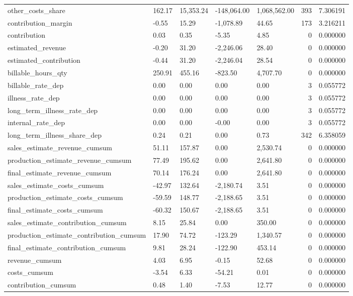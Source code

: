 \begin{longtable}{lllllrr}
other_costs_share & 162.17 & 15,353.24 & -148,064.00 & 1,068,562.00 & 393 & 7.306191 \\
contribution_margin & -0.55 & 15.29 & -1,078.89 & 44.65 & 173 & 3.216211 \\
contribution & 0.03 & 0.35 & -5.35 & 4.85 & 0 & 0.000000 \\
estimated_revenue & -0.20 & 31.20 & -2,246.06 & 28.40 & 0 & 0.000000 \\
estimated_contribution & -0.44 & 31.20 & -2,246.04 & 28.54 & 0 & 0.000000 \\
billable_hours_qty & 250.91 & 455.16 & -823.50 & 4,707.70 & 0 & 0.000000 \\
billable_rate_dep & 0.00 & 0.00 & 0.00 & 0.00 & 3 & 0.055772 \\
illness_rate_dep & 0.00 & 0.00 & 0.00 & 0.00 & 3 & 0.055772 \\
long_term_illness_rate_dep & 0.00 & 0.00 & 0.00 & 0.00 & 3 & 0.055772 \\
internal_rate_dep & 0.00 & 0.00 & -0.00 & 0.00 & 3 & 0.055772 \\
long_term_illness_share_dep & 0.24 & 0.21 & 0.00 & 0.73 & 342 & 6.358059 \\
sales_estimate_revenue_cumsum & 51.11 & 157.87 & 0.00 & 2,530.74 & 0 & 0.000000 \\
production_estimate_revenue_cumsum & 77.49 & 195.62 & 0.00 & 2,641.80 & 0 & 0.000000 \\
final_estimate_revenue_cumsum & 70.14 & 176.24 & 0.00 & 2,641.80 & 0 & 0.000000 \\
sales_estimate_costs_cumsum & -42.97 & 132.64 & -2,180.74 & 3.51 & 0 & 0.000000 \\
production_estimate_costs_cumsum & -59.59 & 148.77 & -2,188.65 & 3.51 & 0 & 0.000000 \\
final_estimate_costs_cumsum & -60.32 & 150.67 & -2,188.65 & 3.51 & 0 & 0.000000 \\
sales_estimate_contribution_cumsum & 8.15 & 25.84 & 0.00 & 350.00 & 0 & 0.000000 \\
production_estimate_contribution_cumsum & 17.90 & 74.72 & -123.29 & 1,340.57 & 0 & 0.000000 \\
final_estimate_contribution_cumsum & 9.81 & 28.24 & -122.90 & 453.14 & 0 & 0.000000 \\
revenue_cumsum & 4.03 & 6.95 & -0.15 & 52.68 & 0 & 0.000000 \\
costs_cumsum & -3.54 & 6.33 & -54.21 & 0.01 & 0 & 0.000000 \\
contribution_cumsum & 0.48 & 1.40 & -7.53 & 12.77 & 0 & 0.000000 \\

\end{longtable}
